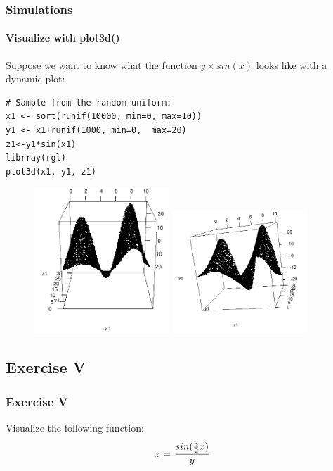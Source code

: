\begin{frame}
\frametitle{Simulations}
\framesubtitle{Visualize with \ttfamily plot3d() \normalfont}

Suppose we want to know what the function $y\times sin(x)$ looks like with a dynamic plot:

\begin{lstlisting}
# Sample from the random uniform:
x1 <- sort(runif(10000, min=0, max=10))
y1 <- x1+runif(1000, min=0,  max=20)
z1<-y1*sin(x1)
librray(rgl)
plot3d(x1, y1, z1)

\end{lstlisting}

\newpage
   \begin{figure}[ht]
       \begin{center}
		\includegraphics[width = 2in]{images/plot3dSin1.png}
		\includegraphics[width = 2in]{images/plot3dSin2.png}
	\end{center}
   \end{figure}
\end{frame}


\subsection{Exercise V}
\begin{frame}
	\frametitle{Exercise V}
	Visualize the following function:
	\begin{equation}
		z \hspace{0.01in} =\hspace{0.01in} \frac{sin(\frac{3}{2}x)}{y}
	\end{equation}	
\end{frame}

